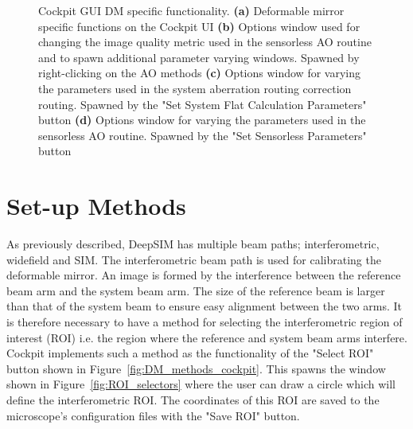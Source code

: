 \begin{figure}[H]
\begin{subfigure}{0.35\textwidth}
	\end{subfigure}
	\caption[Cockpit GUI DM specific functionality]{Cockpit GUI DM specific functionality. \textbf{(a)} Deformable mirror specific functions on the Cockpit UI \textbf{(b)} Options window used for changing the image quality metric used in the sensorless AO routine and to spawn additional parameter varying windows. Spawned by right-clicking on the AO methods \textbf{(c)} Options window for varying the parameters used in the system aberration routing correction routing. Spawned by the "Set System Flat Calculation Parameters" button \textbf{(d)} Options window for varying the parameters used in the sensorless AO routine. Spawned by the "Set Sensorless Parameters" button}
	\label{fig:DeepSIM_control_software}
\end{figure}

\section{Set-up Methods}
\label{sec:set_up_methods}

As previously described, DeepSIM has multiple beam paths; interferometric, widefield and SIM. The interferometric beam path is used for calibrating the deformable mirror. An image is formed by the interference between the reference beam arm and the system beam arm. The size of the reference beam is larger than that of the system beam to ensure easy alignment between the two arms. It is therefore necessary to have a method for selecting the interferometric region of interest (ROI) i.e. the region where the reference and system beam arms interfere. Cockpit implements such a method as the functionality of the "Select ROI" button shown in Figure~\ref{fig:DM_methods_cockpit}. This spawns the window shown in Figure~\ref{fig:ROI_selectors} where the user can draw a circle which will define the interferometric ROI. The coordinates of this ROI are saved to the microscope's configuration files with the "Save ROI" button.

